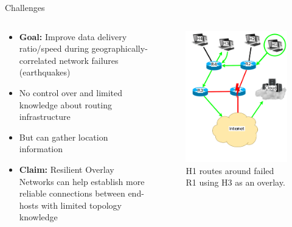 \documentclass[pdftex]{beamer}
\begin{document}
\begin{frame}{Challenges}
\begin{columns}
\begin{column}{.5\textwidth}
\begin{itemize}
	\item \textbf{Goal:} Improve data delivery ratio/speed during geographically-correlated network failures (earthquakes)
	\item No control over and limited knowledge about routing infrastructure
	\item But can gather location information
	\item \textbf{Claim:} Resilient Overlay Networks can help establish more reliable connections between end-hosts with limited topology knowledge
\end{itemize}
\end{column}

\begin{column}{.5\textwidth}
\begin{figure}
\includegraphics[height=.6\textheight]{overlay_path}
\caption{H1 routes around failed R1 using H3 as an overlay.}
\end{figure}
\end{column}

\end{columns}
\end{frame}
\end{document}
